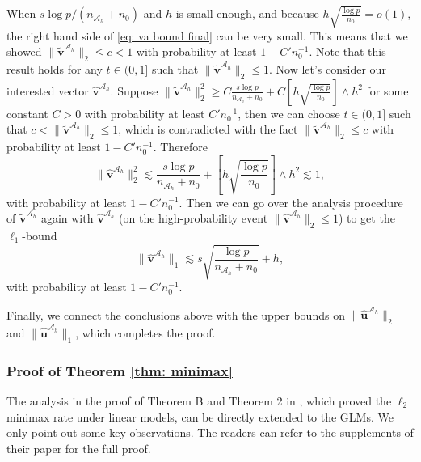 \documentclass[12pt]{article}
\newcommand{\twonorm}[1]{\|#1\|_{2}}
\newcommand{\onenorm}[1]{\|#1\|_{1}}
\newcommand{\huah}{\hat{\bm{u}}^{\mathcal{A}_h}}
\newcommand{\bv}{\bm{v}}
\newcommand{\hvah}{\hat{\bm{v}}^{\mathcal{A}_h}}
\newcommand{\mah}{\mathcal{A}_h}
\newcommand{\nah}{n_{\mathcal{A}_h}}
\newcommand{\<}{\langle}
\renewcommand{\>}{\rangle}
\begin{document}
		When $s\log p/(\nah+n_0)$ and $h$ is small enough, and because $h\sqrt{\frac{\log p}{n_0}} = o(1)$, the right hand side of \eqref{eq: va bound final} can be very small. This means that we showed $\twonorm{\tilde{\bv}^{\mah}} \leq c < 1$ with probability at least $1-C'n_0^{-1}$. Note that this result holds for any $t \in (0, 1]$ such that $\twonorm{\tilde{\bv}^{\mah}} \leq 1$. Now let's consider our interested vector $\hvah$. Suppose $\twonorm{\tilde{\bv}^{\mah}}^2 \geq C\frac{s\log p}{\nah+n_0} + C\left[h\sqrt{\frac{\log p}{n_0}}\right] \wedge h^2$ for some constant $C > 0$ with probability at least $C'n_0^{-1}$, then we can choose $t \in (0, 1]$ such that $c < \twonorm{\tilde{\bv}^{\mah}} \leq 1$, which is contradicted with the fact $\twonorm{\tilde{\bv}^{\mah}} \leq c$ with probability at least $1-C'n_0^{-1}$. Therefore 
		\begin{equation}
			\twonorm{\hvah}^2 \lesssim \frac{s\log p}{\nah+n_0} + \left[h\sqrt{\frac{\log p}{n_0}}\right] \wedge h^2 \lesssim 1,
		\end{equation}
		with probability at least $1-C'n_0^{-1}$.
		Then we can go over the analysis procedure of $\tilde{\bv}^{\mah}$ again with $\hvah$ (on the high-probability event $\twonorm{\hvah} \leq 1$) to get the $\ell_1$-bound
		\begin{equation}
			\onenorm{\hvah} \lesssim s\sqrt{\frac{\log p}{\nah+n_0}} + h,
		\end{equation}
		with probability at least $1-C'n_0^{-1}$.
		
		Finally, we connect the conclusions above with the upper bounds on $\twonorm{\huah}$ and $\onenorm{\huah}$, which completes the proof.
		

\subsubsection{Proof of Theorem \ref{thm: minimax}}
The analysis in the proof of Theorem B and Theorem 2 in \cite{li2021transfer}, which proved the $\ell_2$ minimax rate under linear models, can be directly extended to the GLMs. We only point out some key observations. The readers can refer to the supplements of their paper  for the full proof.
\end{document}
